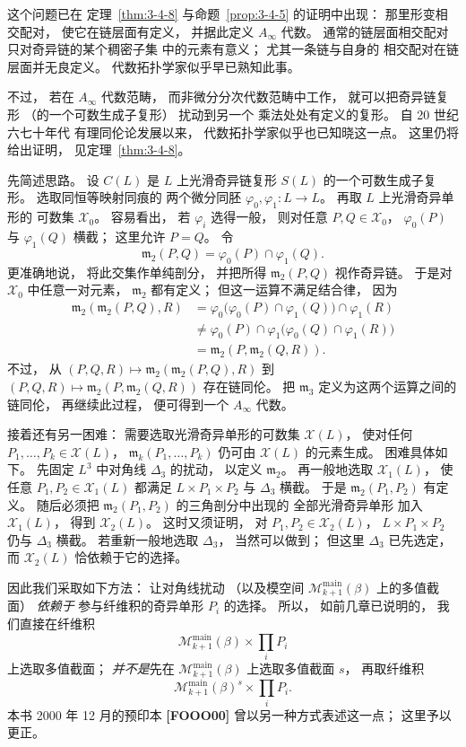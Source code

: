 这个问题已在
定理~\ref{thm:3-4-8}
与命题~\ref{prop:3-4-5}
的证明中出现：
那里形变相交配对，
使它在链层面有定义，
并据此定义 $A_\infty$ 代数。
通常的链层面相交配对
只对奇异链的某个稠密子集
中的元素有意义；
尤其一条链与自身的
相交配对在链层面并无良定义。
代数拓扑学家似乎早已熟知此事。

不过，
若在 $A_\infty$ 代数范畴，
而非微分分次代数范畴中工作，
就可以把奇异链复形
（的一个可数生成子复形）
扰动到另一个
乘法处处有定义的复形。
自 20 世纪六七十年代
有理同伦论发展以来，
代数拓扑学家似乎也已知晓这一点。
这里仍将给出证明，
见定理~\ref{thm:3-4-8}。

先简述思路。
设 $C(L)$ 是
$L$ 上光滑奇异链复形 $S(L)$
的一个可数生成子复形。
选取同恒等映射同痕的
两个微分同胚
$\varphi_0,\varphi_1\colon L\to L$。
再取 $L$ 上光滑奇异单形的
可数集 $\mathcal X_0$。
容易看出，
若 $\varphi_i$ 选得一般，
则对任意
$P,Q\in\mathcal X_0$，
$\varphi_0(P)$
与 $\varphi_1(Q)$ 横截；
这里允许 $P=Q$。
令
\[
\mathfrak m_2(P,Q)
=\varphi_0(P)\cap\varphi_1(Q).
\]
更准确地说，
将此交集作单纯剖分，
并把所得
$\mathfrak m_2(P,Q)$
视作奇异链。
于是对
$\mathcal X_0$
中任意一对元素，
$\mathfrak m_2$
都有定义；
但这一运算不满足结合律，
因为
\[
\begin{aligned}
\mathfrak m_2(\mathfrak m_2(P,Q),R)
&=
\varphi_0\bigl(
\varphi_0(P)\cap\varphi_1(Q)
\bigr)
\cap\varphi_1(R)\\
&\ne
\varphi_0(P)\cap
\varphi_1\bigl(
\varphi_0(Q)\cap\varphi_1(R)
\bigr)\\
&=
\mathfrak m_2(P,\mathfrak m_2(Q,R)).
\end{aligned}
\]
不过，
从
$(P,Q,R)\mapsto
\mathfrak m_2(\mathfrak m_2(P,Q),R)$
到
$(P,Q,R)\mapsto
\mathfrak m_2(P,\mathfrak m_2(Q,R))$
存在链同伦。
把 $\mathfrak m_3$
定义为这两个运算之间的链同伦，
再继续此过程，
便可得到一个
$A_\infty$ 代数。

接着还有另一困难：
需要选取光滑奇异单形的可数集
$\mathcal X(L)$，
使对任何
$P_1,\ldots,P_k\in\mathcal X(L)$，
$\mathfrak m_k(P_1,\ldots,P_k)$
仍可由
$\mathcal X(L)$ 的元素生成。
困难具体如下。
先固定 $L^3$
中对角线 $\Delta_3$
的扰动，
以定义 $\mathfrak m_2$。
再一般地选取
$\mathcal X_1(L)$，
使任意
$P_1,P_2\in\mathcal X_1(L)$
都满足
$L\times P_1\times P_2$
与 $\Delta_3$ 横截。
于是
$\mathfrak m_2(P_1,P_2)$
有定义。
随后必须把
$\mathfrak m_2(P_1,P_2)$
的三角剖分中出现的
全部光滑奇异单形
加入 $\mathcal X_1(L)$，
得到 $\mathcal X_2(L)$。
这时又须证明，
对
$P_1,P_2\in\mathcal X_2(L)$，
$L\times P_1\times P_2$
仍与 $\Delta_3$ 横截。
若重新一般地选取
$\Delta_3$，
当然可以做到；
但这里
$\Delta_3$ 已先选定，
而 $\mathcal X_2(L)$
恰依赖于它的选择。

因此我们采取如下方法：
让对角线扰动
（以及模空间
$\mathcal M^{\mathrm{main}}_{k+1}(\beta)$
上的多值截面）
\emph{依赖于}
参与纤维积的奇异单形
$P_i$ 的选择。
所以，
如前几章已说明的，
我们直接在纤维积
\[
\mathcal M^{\mathrm{main}}_{k+1}(\beta)
\times\prod_i P_i
\]
上选取多值截面；
\emph{并不是}先在
$\mathcal M^{\mathrm{main}}_{k+1}(\beta)$
上选取多值截面 $s$，
再取纤维积
\[
\mathcal M^{\mathrm{main}}_{k+1}(\beta)^s
\times\prod_i P_i.
\]
本书 2000 年 12 月的预印本
\textbf{[FOOO00]}
曾以另一种方式表述这一点；
这里予以更正。
